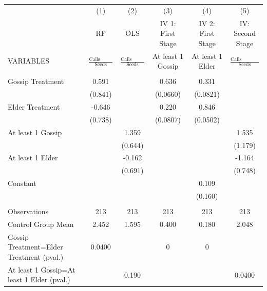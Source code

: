 \begin{tabular}{lccccc} \hline
 & (1) & (2) & (3) & (4) & (5) \\
 & RF & OLS & IV 1: First Stage & IV 2: First Stage & IV: Second Stage \\
VARIABLES & $\frac{\mbox{Calls Received}}{\mbox{Seeds}}$ & $\frac{\mbox{Calls Received}}{\mbox{Seeds}}$ & At least 1 Gossip & At least 1 Elder & $\frac{\mbox{Calls Received}}{\mbox{Seeds}}$ \\ \hline
 &  &  &  &  &  \\
Gossip Treatment & 0.591 &  & 0.636 & 0.331 &  \\
 & (0.841) &  & (0.0660) & (0.0821) &  \\
Elder Treatment & -0.646 &  & 0.220 & 0.846 &  \\
 & (0.738) &  & (0.0807) & (0.0502) &  \\
At least 1 Gossip &  & 1.359 &  &  & 1.535 \\
 &  & (0.644) &  &  & (1.179) \\
At least 1 Elder &  & -0.162 &  &  & -1.164 \\
 &  & (0.691) &  &  & (0.748) \\
Constant &  &  &  & 0.109 &  \\
 &  &  &  & (0.160) &  \\
 &  &  &  &  &  \\
Observations & 213 & 213 & 213 & 213 & 213 \\
Control Group Mean & 2.452 & 1.595 & 0.400 & 0.180 & 2.048 \\
Gossip Treatment=Elder Treatment (pval.) & 0.0400 &  & 0 & 0 &  \\
 At least 1 Gossip=At least 1 Elder (pval.) &  & 0.190 &  &  & 0.0400 \\ \hline
\end{tabular}
